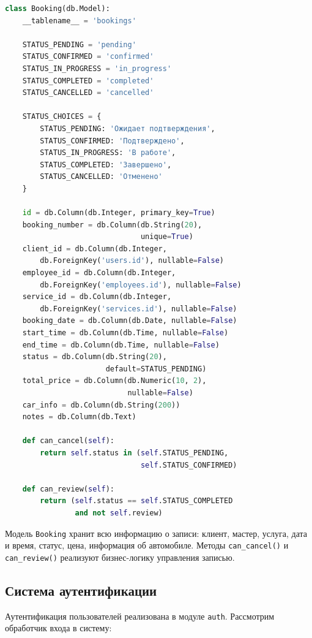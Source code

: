 \documentclass[14pt,a4paper,oneside]{extarticle}
\begin{document}
\begin{lstlisting}[language=Python, caption={Модель записи на обслуживание (Booking)}, label={lst:booking_model}]
class Booking(db.Model):
    __tablename__ = 'bookings'

    STATUS_PENDING = 'pending'
    STATUS_CONFIRMED = 'confirmed'
    STATUS_IN_PROGRESS = 'in_progress'
    STATUS_COMPLETED = 'completed'
    STATUS_CANCELLED = 'cancelled'

    STATUS_CHOICES = {
        STATUS_PENDING: 'Ожидает подтверждения',
        STATUS_CONFIRMED: 'Подтверждено',
        STATUS_IN_PROGRESS: 'В работе',
        STATUS_COMPLETED: 'Завершено',
        STATUS_CANCELLED: 'Отменено'
    }

    id = db.Column(db.Integer, primary_key=True)
    booking_number = db.Column(db.String(20),
                               unique=True)
    client_id = db.Column(db.Integer,
        db.ForeignKey('users.id'), nullable=False)
    employee_id = db.Column(db.Integer,
        db.ForeignKey('employees.id'), nullable=False)
    service_id = db.Column(db.Integer,
        db.ForeignKey('services.id'), nullable=False)
    booking_date = db.Column(db.Date, nullable=False)
    start_time = db.Column(db.Time, nullable=False)
    end_time = db.Column(db.Time, nullable=False)
    status = db.Column(db.String(20),
                       default=STATUS_PENDING)
    total_price = db.Column(db.Numeric(10, 2),
                            nullable=False)
    car_info = db.Column(db.String(200))
    notes = db.Column(db.Text)

    def can_cancel(self):
        return self.status in (self.STATUS_PENDING,
                               self.STATUS_CONFIRMED)

    def can_review(self):
        return (self.status == self.STATUS_COMPLETED
                and not self.review)
\end{lstlisting}

Модель \texttt{Booking} хранит всю информацию о записи: клиент, мастер, услуга, дата и время, статус, цена, информация об автомобиле. Методы \texttt{can\_cancel()} и \texttt{can\_review()} реализуют бизнес-логику управления записью.

\subsection{Система аутентификации}

Аутентификация пользователей реализована в модуле \texttt{auth}. Рассмотрим обработчик входа в систему:
\end{document}
